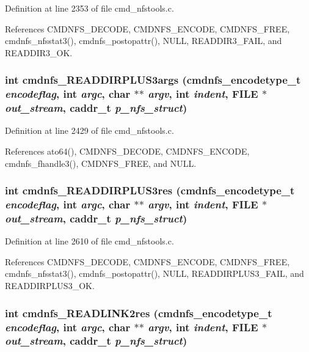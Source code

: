 Definition at line 2353 of file cmd\_\-nfstools.c.

References CMDNFS\_\-DECODE, CMDNFS\_\-ENCODE, CMDNFS\_\-FREE, cmdnfs\_\-nfsstat3(), cmdnfs\_\-postopattr(), NULL, READDIR3\_\-FAIL, and READDIR3\_\-OK.
\subsubsection{\setlength{\rightskip}{0pt plus 5cm}int cmdnfs\_\-READDIRPLUS3args ({\bf cmdnfs\_\-encodetype\_\-t} {\em encodeflag}, int {\em argc}, char $\ast$$\ast$ {\em argv}, int {\em indent}, FILE $\ast$ {\em out\_\-stream}, caddr\_\-t {\em p\_\-nfs\_\-struct})}\label{cmd__nfstools_8h_a44}




Definition at line 2429 of file cmd\_\-nfstools.c.

References ato64(), CMDNFS\_\-DECODE, CMDNFS\_\-ENCODE, cmdnfs\_\-fhandle3(), CMDNFS\_\-FREE, and NULL.
\subsubsection{\setlength{\rightskip}{0pt plus 5cm}int cmdnfs\_\-READDIRPLUS3res ({\bf cmdnfs\_\-encodetype\_\-t} {\em encodeflag}, int {\em argc}, char $\ast$$\ast$ {\em argv}, int {\em indent}, FILE $\ast$ {\em out\_\-stream}, caddr\_\-t {\em p\_\-nfs\_\-struct})}\label{cmd__nfstools_8h_a45}




Definition at line 2610 of file cmd\_\-nfstools.c.

References CMDNFS\_\-DECODE, CMDNFS\_\-ENCODE, CMDNFS\_\-FREE, cmdnfs\_\-nfsstat3(), cmdnfs\_\-postopattr(), NULL, READDIRPLUS3\_\-FAIL, and READDIRPLUS3\_\-OK.
\subsubsection{\setlength{\rightskip}{0pt plus 5cm}int cmdnfs\_\-READLINK2res ({\bf cmdnfs\_\-encodetype\_\-t} {\em encodeflag}, int {\em argc}, char $\ast$$\ast$ {\em argv}, int {\em indent}, FILE $\ast$ {\em out\_\-stream}, caddr\_\-t {\em p\_\-nfs\_\-struct})}\label{cmd__nfstools_8h_a28}





